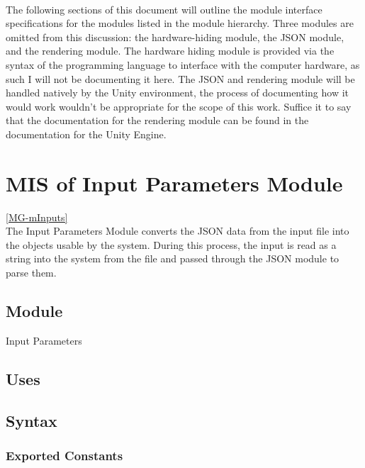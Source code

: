 \documentclass[12pt, titlepage]{article}
\begin{document}
~\newpage

The following sections of this document will outline the module interface 
specifications for the modules listed in the module hierarchy. Three modules 
are omitted from this discussion: the hardware-hiding module, the JSON module, 
and the rendering module. The hardware hiding module is provided via the syntax 
of the programming language to interface with the computer hardware, as such I 
will not be documenting it here. The JSON and rendering module will be handled 
natively by the Unity environment, the process of documenting how it would work 
wouldn't be appropriate for the scope of this work. Suffice it to say that the 
documentation for the rendering module can be found in the documentation for 
the Unity Engine.

\section{MIS of Input Parameters Module} \ref{MG-mInputs} \\
The Input Parameters Module converts the JSON data from the input file into the 
objects usable by the system. During this process, the input is read as a 
string into the system from the file and passed through the JSON module to 
parse them.

\subsection{Module}
Input Parameters

\subsection{Uses}

\subsection{Syntax}
\subsubsection{Exported Constants}
\end{document}
